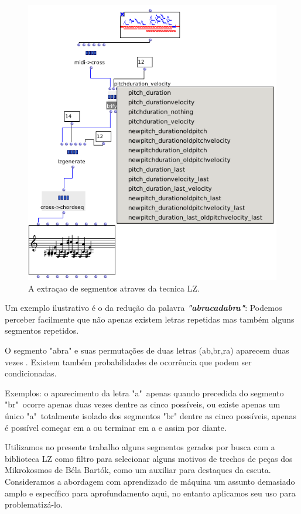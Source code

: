 \documentclass[
	12pt,				%
	openright,			%
	twoside,			%
	a4paper,			%
	english,			%
	french,				%
	spanish,			%
	brazil				%
	]{abntex2}
\begin{document}
\begin{figure}[!h]
	\caption{\label{fig_grafico}A extraçao de segmentos atraves da tecnica LZ. }
	\begin{center}
	    \includegraphics[scale=0.55]{OM_settheory/LZfy.png}
	\end{center}
\end{figure}



Um exemplo ilustrativo é o da redução da palavra \textbf{\textit{"abracadabra"}}: Podemos perceber facilmente que não apenas existem letras repetidas mas também alguns segmentos repetidos. 

O segmento "abra" e suas permutações de duas letras (ab,br,ra) aparecem duas vezes . Existem também probabilidades de ocorrência que podem ser condicionadas.  

Exemplos: o aparecimento da letra "a"\ apenas quando precedida do segmento "br"\ ocorre apenas duas vezes dentre as cinco possíveis, ou existe apenas um único "a"\ totalmente isolado dos segmentos "br" dentre as cinco possíveis, apenas é possível começar em a ou terminar em a e assim por diante.

Utilizamos no presente trabalho alguns segmentos gerados por busca com a biblioteca LZ como filtro para selecionar alguns motivos de trechos de peças dos Mikrokosmos de Béla Bartók, como um auxiliar para destaques da escuta. Consideramos a abordagem com aprendizado de máquina um assunto demasiado amplo e específico para aprofundamento aqui, no entanto aplicamos seu uso para problematizá-lo.
\end{document}
